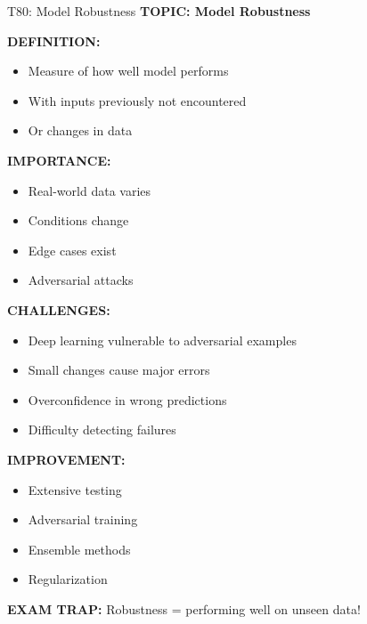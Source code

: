 \documentclass[8pt]{beamer}
\begin{document}
	\begin{frame}{T80: Model Robustness}
		\fontsize{6.5}{7.5}\selectfont
		\textbf{TOPIC: Model Robustness}
		
		\vspace{0.1cm}
		\textbf{DEFINITION:}
		\begin{itemize}
			\item Measure of how well model performs
			\item With inputs previously not encountered
			\item Or changes in data
		\end{itemize}
		
		\vspace{0.1cm}
		\textbf{IMPORTANCE:}
		\begin{itemize}
			\item Real-world data varies
			\item Conditions change
			\item Edge cases exist
			\item Adversarial attacks
		\end{itemize}
		
		\vspace{0.1cm}
		\textbf{CHALLENGES:}
		\begin{itemize}
			\item Deep learning vulnerable to adversarial examples
			\item Small changes cause major errors
			\item Overconfidence in wrong predictions
			\item Difficulty detecting failures
		\end{itemize}
		
		\vspace{0.1cm}
		\textbf{IMPROVEMENT:}
		\begin{itemize}
			\item Extensive testing
			\item Adversarial training
			\item Ensemble methods
			\item Regularization
		\end{itemize}
		
		\textcolor{myred}{\textbf{EXAM TRAP:}} Robustness = \textcolor{myblue}{performing well on unseen data}!
	\end{frame}
	
\end{document}
